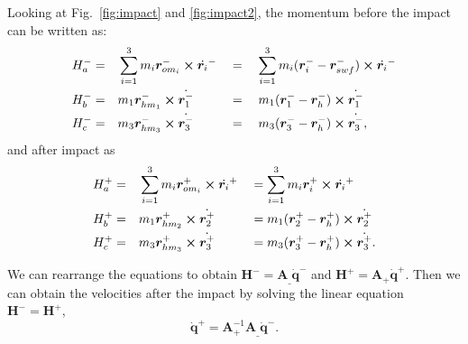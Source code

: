 Looking at Fig.~\ref{fig:impact} and \ref{fig:impact2}, the momentum before the impact can be written as:
\begin{alignat}{2}
H_a^- = & \quad\sum_{i=1}^{3} m_i \bm{r}_{{om}_i}^{-} \cross \dot{\bm{r}_i}^{-} && = \quad \sum_{i=1}^{3} m_i (\bm{r}_i^{-} - \bm{r}_{swf}^{-}) \cross \dot{\bm{r}_i}^{-}\\
H_b^- = &\quad m_1 \bm{r}_{hm_1}^- \cross \dot{\bm{r}_1^-} && = \quad m_1 (\bm{r}_{1}^- - \bm{r}_{h}^-) \cross \dot{\bm{r}_1^-} \\
H_c^- = &\quad m_3 \bm{r}_{hm_3}^- \cross \dot{\bm{r}_3^-} && = \quad m_3 (\bm{r}_3^- - \bm{r}_h^-) \cross \dot{\bm{r}_3^-},
\end{alignat}
and after impact as
\begin{alignat}{2}
H_a^+ = &\quad \sum_{i=1}^{3} m_i \bm{r}_{{om}_i}^{+} \cross \dot{\bm{r}_i}^{+} && = \sum_{i=1}^{3} m_i \bm{r}_i^{+} \cross \dot{\bm{r}_i}^{+}\\ 
H_b^+ = & \quad m_1 \bm{r}_{{hm}_2}^+ \cross \dot{\bm{r}_2^+} && = m_1 (\bm{r}_{2}^+ - \bm{r}_{h}^+ ) \cross \dot{\bm{r}_2^+} \\
H_c^+ = & \quad m_3 \bm{r}_{{hm}_3}^+ \cross \dot{\bm{r}_3^+} && = m_3 (\bm{r}_{3}^+ - \bm{r}_{h}^+) \cross \dot{\bm{r}_3^+}.
\end{alignat}

We can rearrange the equations to obtain $\bm{H}^- = \bm{A}_{\_} \dot{\bm{q}}^-$ and $\bm{H}^+ = \bm{A}_{+} \dot{\bm{q}}^+$. Then we can obtain the velocities after the impact by solving the linear equation $\bm{H}^- = \bm{H}^+$, 
\begin{equation}
\dot{\bm{q}}^+ = \bm{A}_{+}^{-1} \bm{A}_{\_}  \dot{\bm{q}}^-. 
\end{equation}

